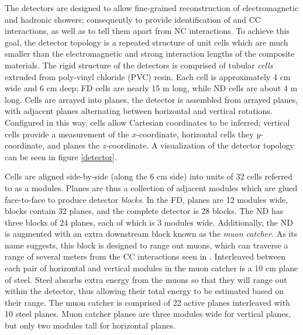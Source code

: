 \begin{figure}[t]
\begin{subfigure}[t]{0.75\textwidth}
        \end{subfigure}
        \caption{}
\end{figure}

 The \nova detectors are designed to allow fine-grained reconstruction of electromagnetic and hadronic showers; consequently to provide identification of \numu and \nue CC interactions, as well as to tell them apart from NC interactions.  To achieve this goal, the detector topology is a repeated structure of unit cells which are much smaller than the electromagnetic and strong interaction lengths of the composite materials.  The rigid structure of the detectors is comprised of tubular \textit{cells} extruded from poly-vinyl chloride (PVC) resin.  Each cell is approximately 4 cm wide and 6 cm deep; FD cells are nearly 15 m long, while ND cells are about 4 m long.  Cells are arrayed into planes, the detector is assembled from arrayed planes, with adjacent planes alternating between horizontal and vertical rotations.  Configured in this way, cells allow Cartesian coordinates to be inferred; vertical cells provide a measurement of the $x$-coordinate, horizontal cells they $y$-coordinate, and planes the $z$-coordinate.  A visualization of the detector topology can be seen in figure \ref{detector}.  

 Cells are aligned side-by-side (along the 6 cm side) into units of 32 cells referred to as a modules.  Planes are thus a collection of adjacent modules which are glued face-to-face to produce detector \textit{blocks}.  In the FD, planes are 12 modules wide, blocks contain 32 planes, and the complete detector is 28 blocks.  The ND has three blocks of 24 planes, each of which is 3 modules wide.  Additionally, the ND is augmented with an extra downstream block known as the \textit{muon catcher}.  As its name suggests, this block is designed to range out muons, which can traverse a range of several meters from the \numu CC interactions seen  in \nova.  Interleaved between each pair of horizontal and vertical modules in the muon catcher is a 10 cm plane of steel.  Steel absorbs extra energy from the muons so that they will range out within the detector, thus allowing their total energy to be estimated based on their range.  The muon catcher is comprised of 22 active planes interleaved with 10 steel planes.  Muon catcher planes are three modules wide for vertical planes, but only two modules tall for horizontal planes.

